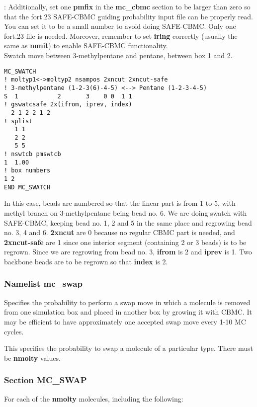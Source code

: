 \documentclass[12pt,letterpaper]{article}
\begin{document}
: Additionally, set one {\bf pmfix} in the {\bf mc\_cbmc} section to be larger than zero so that the fort.23 SAFE-CBMC guiding probability input file can be properly read. You can set it to be a small number to avoid doing SAFE-CBMC. Only one fort.23 file is needed. Moreover, remember to set {\bf iring} correctly (usually the same as {\bf nunit}) to enable SAFE-CBMC functionality. \\

\hfill\break
Swatch move between 3-methylpentane and pentane, between box 1 and 2.

\begin{verbatim}
MC_SWATCH
! moltyp1<->moltyp2 nsampos 2xncut 2xncut-safe  
! 3-methylpentane (1-2-3(6)-4-5) <--> Pentane (1-2-3-4-5)
S  1           2       3    0 0  1 1
! gswatcsafe 2x(ifrom, iprev, index)
  2 1 2 2 1 2
! splist
   1 1
   2 2
   5 5
! nswtcb pmswtcb
1  1.00
! box numbers
1 2
END MC_SWATCH
\end{verbatim}

\noindent In this case, beads are numbered so that the linear part is from 1 to 5, with methyl branch on 3-methylpentane being bead no. 6. We are doing swatch with SAFE-CBMC, keeping bead no. 1, 2 and 5 in the same place and regrowing bead no. 3, 4 and 6. {\bf 2xncut} are 0 because no regular CBMC part is needed, and {\bf 2xncut-safe} are 1 since one interior segment (containing 2 or 3 beads) is to be regrown. Since we are regrowing from bead no. 3, {\bf ifrom} is 2 and {\bf iprev} is 1. Two backbone beads are to be regrown so that {\bf index} is 2.


\subsubsection{Namelist \textbf{mc\_swap}}
 Specifies the probability to perform
a swap move in which a molecule is removed from one
simulation box and placed in another box by growing it with
CBMC. It may be efficient to have approximately one accepted
swap move every 1-10 MC cycles.

 This specifies the probability to
swap a molecule of a particular type. There must be {\bf
  nmolty} values.

\subsubsection{Section \textbf{MC\_SWAP}}
For each of the \textbf{nmolty} molecules, including the following:
\end{document}
